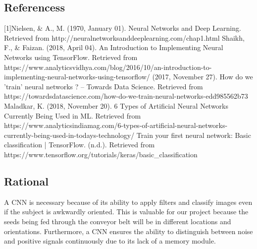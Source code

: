 \subsection{Referencess}
[1]Nielsen, \& A., M. (1970, January 01). Neural Networks and Deep Learning. Retrieved from http://neuralnetworksanddeeplearning.com/chap1.html \newline
[2]Shaikh, F., \& Faizan. (2018, April 04). An Introduction to Implementing Neural Networks using TensorFlow. Retrieved from https://www.analyticsvidhya.com/blog/2016/10/an-introduction-to-implementing-neural-networks-using-tensorflow/ \newline
[3](2017, November 27). How do we 'train' neural networks ? – Towards Data Science. Retrieved from https://towardsdatascience.com/how-do-we-train-neural-networks-edd985562b73 \newline
[4]Maladkar, K. (2018, November 20). 6 Types of Artificial Neural Networks Currently Being Used in ML. Retrieved from https://www.analyticsindiamag.com/6-types-of-artificial-neural-networks-currently-being-used-in-todays-technology/ \newline
[5]Train your first neural network: Basic classification | TensorFlow. (n.d.). Retrieved from https://www.tensorflow.org/tutorials/keras/basic\_classification \newline
\subsection{Rational} A CNN is necessary because of its ability to apply filters and classify images even if the subject is awkwardly oriented. This is valuable for our project because the seeds being fed through the conveyor belt will be in different locations and orientations. Furthermore, a CNN ensures the ability to distinguish between noise and positive signals continuously due to its lack of a memory module. 
